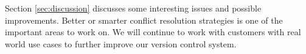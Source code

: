 \documentclass[sigconf,nonacm]{acmart} %
\begin{document}
Section \ref{sec:discussion} discusses some interesting issues 
and possible improvements.  Better or smarter conflict 
resolution strategies is one of the important areas to work on.
We will continue to work with customers with real world use 
cases to further improve our version control system.  







\renewcommand\bibname{References}


\end{document}
